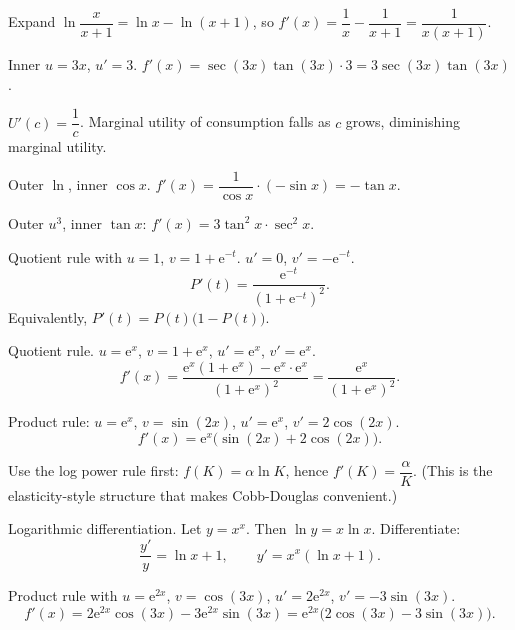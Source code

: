 \begin{solutions}
  \item Expand $\ln\dfrac{x}{x+1}=\ln x-\ln(x+1)$, so
        $f'(x)=\dfrac{1}{x}-\dfrac{1}{x+1}=\dfrac{1}{x(x+1)}$.

  \item Inner $u=3x$, $u'=3$. $f'(x)=\sec(3x)\tan(3x)\cdot 3
        =3\sec(3x)\tan(3x)$.

  \item $U'(c)=\dfrac{1}{c}$. Marginal utility of consumption falls as $c$
        grows, diminishing marginal utility.

  \item Outer $\ln$, inner $\cos x$. $f'(x)=\dfrac{1}{\cos x}\cdot(-\sin x)
        =-\tan x$.

  \item Outer $u^{3}$, inner $\tan x$: $f'(x)=3\tan^{2}x\cdot\sec^{2}x$.

  \item Quotient rule with $u=1$, $v=1+\mathrm{e}^{-t}$. $u'=0$,
        $v'=-\mathrm{e}^{-t}$.
        \[
          P'(t)=\frac{\mathrm{e}^{-t}}{(1+\mathrm{e}^{-t})^{2}} .
        \]
        Equivalently, $P'(t)=P(t)\bigl(1-P(t)\bigr)$.

  \item Quotient rule. $u=\mathrm{e}^{x}$, $v=1+\mathrm{e}^{x}$,
        $u'=\mathrm{e}^{x}$, $v'=\mathrm{e}^{x}$.
        \[
          f'(x)=\frac{\mathrm{e}^{x}(1+\mathrm{e}^{x})-\mathrm{e}^{x}\cdot\mathrm{e}^{x}}
               {(1+\mathrm{e}^{x})^{2}}=\frac{\mathrm{e}^{x}}{(1+\mathrm{e}^{x})^{2}} .
        \]

  \item Product rule: $u=\mathrm{e}^{x}$, $v=\sin(2x)$, $u'=\mathrm{e}^{x}$,
        $v'=2\cos(2x)$.
        \[
          f'(x)=\mathrm{e}^{x}\bigl(\sin(2x)+2\cos(2x)\bigr) .
        \]

  \item Use the log power rule first: $f(K)=\alpha\ln K$, hence
        $f'(K)=\dfrac{\alpha}{K}$. (This is the elasticity-style structure
        that makes Cobb-Douglas convenient.)

  \item Logarithmic differentiation. Let $y=x^{x}$. Then $\ln y=x\ln x$.
        Differentiate:
        \[
          \frac{y'}{y}=\ln x+1,\qquad y'=x^{x}(\ln x+1) .
        \]

  \item Product rule with $u=\mathrm{e}^{2x}$, $v=\cos(3x)$,
        $u'=2\mathrm{e}^{2x}$, $v'=-3\sin(3x)$.
        \[
          f'(x)=2\mathrm{e}^{2x}\cos(3x)-3\mathrm{e}^{2x}\sin(3x)
               =\mathrm{e}^{2x}\bigl(2\cos(3x)-3\sin(3x)\bigr) .
        \]


\end{solutions}
